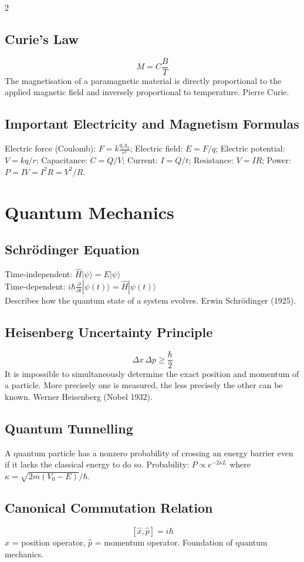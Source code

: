 \documentclass[10pt,a4paper]{article}
\begin{document}
\begin{multicols}{2}
\subsection{Curie's Law}
\[
M = C\frac{B}{T}
\]
The magnetisation of a paramagnetic material is directly proportional to the applied magnetic field and inversely proportional to temperature. Pierre Curie.

\subsection{Important Electricity and Magnetism Formulas}
Electric force (Coulomb): $F = k\frac{q_1 q_2}{r^2}$; Electric field: $E = F/q$; Electric potential: $V = kq/r$; Capacitance: $C = Q/V$; Current: $I = Q/t$; Resistance: $V = IR$; Power: $P = IV = I^2R = V^2/R$.

\section{Quantum Mechanics}

\subsection{Schr\"odinger Equation}
Time-independent: $\hat{H}|\psi\rangle = E|\psi\rangle$\\
Time-dependent: $i\hbar\frac{\partial}{\partial t}|\psi(t)\rangle = \hat{H}|\psi(t)\rangle$\\
Describes how the quantum state of a system evolves. Erwin Schr\"odinger (1925).

\subsection{Heisenberg Uncertainty Principle}
\[
\Delta x\,\Delta p \geq \frac{\hbar}{2}
\]
It is impossible to simultaneously determine the exact position and momentum of a particle. More precisely one is measured, the less precisely the other can be known. Werner Heisenberg (Nobel 1932).

\subsection{Quantum Tunnelling}
A quantum particle has a nonzero probability of crossing an energy barrier even if it lacks the classical energy to do so. Probability: $P \propto e^{-2\kappa L}$ where $\kappa = \sqrt{2m(V_0-E)}/\hbar$.

\subsection{Canonical Commutation Relation}
\[
[\hat{x},\hat{p}] = i\hbar
\]
$\hat{x}$ = position operator, $\hat{p}$ = momentum operator. Foundation of quantum mechanics.


\end{multicols}
\end{document}
